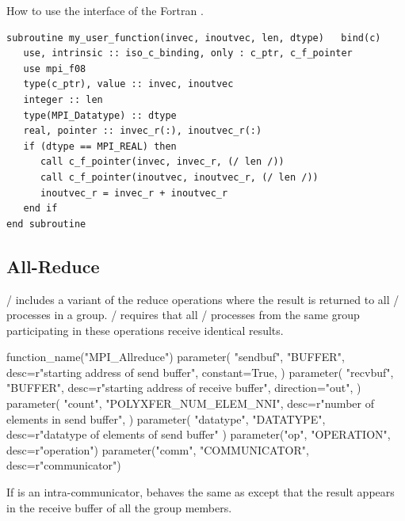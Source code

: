 \begin{example}
\label{coll-exX-fortran}
%
%
How to use the  interface of the Fortran .
\begin{lstlisting}[language={[MPI08]Fortran}]
subroutine my_user_function(invec, inoutvec, len, dtype)   bind(c)
   use, intrinsic :: iso_c_binding, only : c_ptr, c_f_pointer
   use mpi_f08
   type(c_ptr), value :: invec, inoutvec
   integer :: len
   type(MPI_Datatype) :: dtype
   real, pointer :: invec_r(:), inoutvec_r(:)
   if (dtype == MPI_REAL) then
      call c_f_pointer(invec, invec_r, (/ len /))
      call c_f_pointer(inoutvec, inoutvec_r, (/ len /))
      inoutvec_r = invec_r + inoutvec_r
   end if
end subroutine
\end{lstlisting}
\end{example}

\subsection{All-Reduce}
\label{subsec:coll-all-reduce}

\MPI/ includes
a variant
of the reduce operations
where the result is returned to all \MPI/ processes in
a
group.
\MPI/ requires that all \MPI/ processes
from the same group
participating in these operations
receive identical results.

%
\begin{mpi-binding}
    function_name("MPI_Allreduce")
    parameter(
        "sendbuf",
        "BUFFER",
        desc=r"starting address of send buffer",
        constant=True,
    )
    parameter(
        "recvbuf",
        "BUFFER",
        desc=r"starting address of receive buffer",
        direction="out",
    )
    parameter(
        "count",
        "POLYXFER_NUM_ELEM_NNI",
        desc=r"number of elements in send buffer",
    )
    parameter(
        "datatype", "DATATYPE", desc=r"datatype of elements of send buffer"
    )
    parameter("op", "OPERATION", desc=r"operation")
    parameter("comm", "COMMUNICATOR", desc=r"communicator")
\end{mpi-binding}

If  is an intra-communicator,
 behaves the
same as  except that the result
appears in the receive buffer of all the group members.

